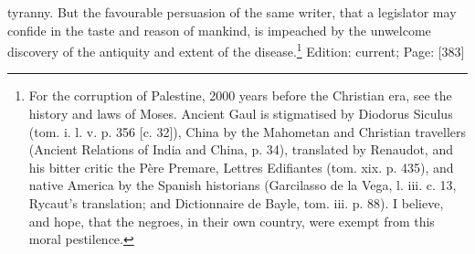 tyranny. But the favourable persuasion of the same writer, that a legislator may confide in the taste and reason of mankind, is impeached by the unwelcome discovery of the antiquity and extent of the disease.\footnote{For the corruption of Palestine, 2000 years before the Christian era, see the history and laws of Moses. Ancient Gaul is stigmatised by Diodorus Siculus (tom. i. l. v. p. 356 [c. 32]), China by the Mahometan and Christian travellers (Ancient Relations of India and China, p. 34), translated by Renaudot, and his bitter critic the Père Premare, Lettres Edifiantes (tom. xix. p. 435), and native America by the Spanish historians (Garcilasso de la Vega, l. iii. c. 13, Rycaut\texthebrew{}’s translation; and Dictionnaire de Bayle, tom. iii. p. 88). I believe, and hope, that the negroes, in their own country, were exempt from this moral pestilence.}
Edition: current; Page: [383]

